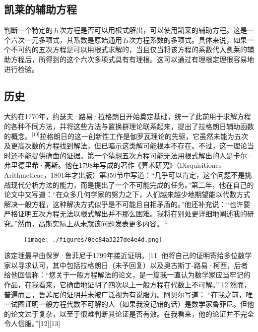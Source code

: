 \subsection{凯莱的辅助方程}
判断一个特定的五次方程是否可以用根式解出，可以使用凯莱的辅助方程。这是一个六次一元多项式，其系数是原始通用五次方程系数的多项式。具体来说，如果一个不可约的五次方程是可以用根式求解的，当且仅当将该方程的系数代入凯莱的辅助方程后，所得到的这个六次多项式具有有理根。这可以通过有理根定理很容易地进行检验。
\subsection{历史}
大约在1770年，约瑟夫·路易·拉格朗日开始奠定基础，统一了此前用于求解方程的各种不同方法，并将这些方法与置换群理论联系起来，提出了拉格朗日辅助函数的概念。\(^\text{[10]}\)拉格朗日的这一创新性工作是伽罗瓦理论的先驱，它虽然未能为五次及更高次数的方程找到解法，但已暗示这类解可能根本不存在。不过，这一理论当时还不能提供确凿的证据。第一个猜想五次方程可能无法用根式解出的人是卡尔·弗里德里希·高斯。他在1798年写成的著作《算术研究》（Disquisitiones Arithmeticae，1801年才出版）第359节中写道：“几乎可以肯定，这个问题不是挑战现代分析方法的能力，而是提出了一个不可能完成的任务。”第二年，他在自己的论文中又写道：“在众多几何学家的努力之下，人们越来越少地期望能以代数方式解决一般方程，这种解决方式似乎是不可能且自相矛盾的。”他还补充说：“也许要严格证明五次方程无法以根式解出并不那么困难。我将在别处更详细地阐述我的研究。”然而，高斯实际上从未就该问题发表更多内容。\(^\text{[1]}\)
\begin{figure}[ht]
\centering
\texttt{[image: ./figures/0ec84a3227de4e4d.png]}
\caption{} \label{fig_ABRR_1}
\end{figure}
该定理最早由保罗·鲁菲尼于1799年接近证明。[11] 他将自己的证明寄给多位数学家以寻求认可，其中包括拉格朗日（未予回复）以及奥古斯丁-路易·柯西，后者给他回信称：“您关于一般方程解法的论文，是一篇我一直认为数学家应当牢记的作品，在我看来，它确凿地证明了四次以上一般方程在代数上不可解。”[12]然而，普遍而言，鲁菲尼的证明并未被广泛视为有说服力。阿贝尔写道： “在我之前，唯一试图证明一般方程代数不可解的人（如果我没记错的话）是数学家鲁菲尼。但他的论文过于复杂，以至于很难判断其论证是否有效。在我看来，他的论证并不完全令人信服。”[12][13]
